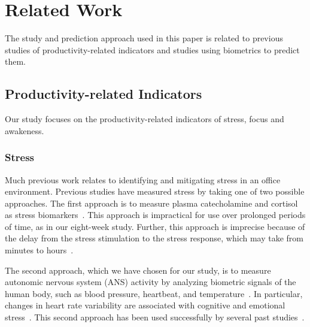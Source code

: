 \section{Related Work}

The study and prediction approach used in this paper is related
to previous studies of productivity-related indicators and studies
using biometrics to predict them. 

\subsection{Productivity-related Indicators}

Our study focuses on the productivity-related indicators of stress, focus and awakeness.


\vspace{-8mm}

\subsubsection{Stress}

Much previous work relates to identifying and mitigating stress in an office environment.
Previous studies have measured stress by taking one of two possible approaches.
The first approach is to measure plasma catecholamine and cortisol as stress biomarkers~\cite{piazza10}.
This approach is impractical for use over prolonged periods of time, as in our eight-week study.
Further, this approach is imprecise because of the delay from the stress stimulation to the stress response, which 
may take from minutes to hours~\cite{Chandola10,Hellhammer09}.

The second approach, which we have chosen for our study, is to measure autonomic nervous system (ANS) activity by analyzing biometric signals of the human body, such as blood pressure, heartbeat, and temperature~\cite{kataoka00,Eekelen04,valentini10}.
In particular, changes in heart rate variability are associated with cognitive and emotional stress~\cite{mcduff16,dishman2000stress}.
This second approach has been used successfully by several past studies~\cite{Force96,gal07,montano09}.

